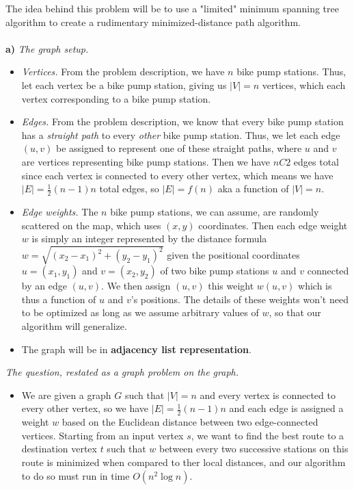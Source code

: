 \documentclass[11pt]{article}
\begin{document}
\begin{solution}
The idea behind this problem will be to use a "limited" minimum spanning tree algorithm to create a rudimentary minimized-distance path algorithm.
\\\\
\textbf{a)} \textit{The graph setup.}
\begin{itemize}
    \item \textit{Vertices.} From the problem description, we have $n$ bike pump stations. Thus, let each vertex be a bike pump station, giving us $|V| = n$ vertices, which each vertex corresponding to a bike pump station.
    \item \textit{Edges.} From the problem description, we know that every bike pump station has a \textit{straight path} to every \textit{other} bike pump station. Thus, we let each edge $(u,v)$ be assigned to represent one of these straight paths, where $u$ and $v$ are vertices representing bike pump stations. Then we have $nC2$ edges total since each vertex is connected to every other vertex, which means we have $|E| = \frac{1}{2}(n - 1)n$ total edges, so $|E| = f(n)$ aka a function of $|V| = n$.
    \item \textit{Edge weights.} The $n$ bike pump stations, we can assume, are randomly scattered on the map, which uses $(x,y)$ coordinates. Then each edge weight $w$ is simply an integer represented by the distance formula $w = \sqrt{(x_2 - x_1)^2 + (y_2 - y_1)^2}$ given the positional coordinates $u = (x_1, y_1)$ and $v = (x_2, y_2)$ of two bike pump stations $u$ and $v$ connected by an edge $(u, v)$. We then assign $(u,v)$ this weight $w(u,v)$ which is thus a function of $u$ and $v$'s positions. The details of these weights won't need to be optimized as long as we assume arbitrary values of $w$, so that our algorithm will generalize.
    \item The graph will be in \textbf{adjacency list representation}.
\end{itemize}
\textit{The question, restated as a graph problem on the graph.}
\begin{itemize}
    \item We are given a graph $G$ such that $|V| = n$ and every vertex is connected to every other vertex, so we have $|E| = \frac{1}{2}(n - 1)n$ and each edge is assigned a weight $w$ based on the Euclidean distance between two edge-connected vertices. Starting from an input vertex $s$, we want to find the best route to a destination vertex $t$ such that $w$ between every two successive stations on this route is minimized when compared to ther local distances, and our algorithm to do so must run in time $O( n^2 \log{n})$.

\end{itemize}
\end{solution}
\end{document}
